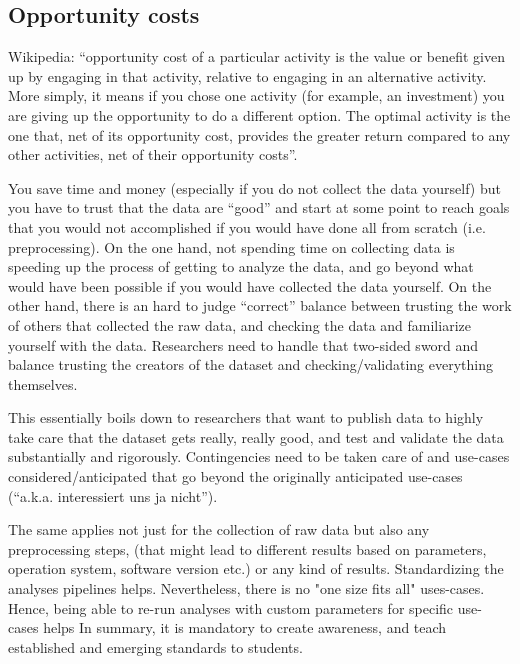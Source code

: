 \subsection{Opportunity costs}

Wikipedia: ``opportunity cost of a particular activity is the value or benefit
given up by engaging in that activity, relative to engaging in an alternative
activity.
%
More simply, it means if you chose one activity (for example, an investment) you
are giving up the opportunity to do a different option.
%
The optimal activity is the one that, net of its opportunity cost, provides the
greater return compared to any other activities, net of their opportunity
costs''.

%
You save time and money (especially if you do not collect the data yourself) but
you have to trust that the data are ``good'' and start at some point to reach
goals that you would not accomplished if you would have done all from scratch
(i.e. preprocessing).
%
On the one hand, not spending time on collecting data is speeding up the process
of getting to analyze the data, and go beyond what would have been possible if
you would have collected the data yourself.
%
On the other hand, there is an hard to judge ``correct'' balance between
trusting the work of others that collected the raw data, and checking the data
and familiarize yourself with the data.
%
Researchers need to handle that two-sided sword and balance trusting the
creators of the dataset and checking/validating everything themselves.

%
This essentially boils down to researchers that want to publish data to highly
take care that the dataset gets really, really good, and test and validate the
data substantially and rigorously.
%
Contingencies need to be taken care of and use-cases considered/anticipated that
go beyond the originally anticipated use-cases (``a.k.a. interessiert uns ja
nicht'').

%
The same applies not just for the collection of raw data but also any
preprocessing steps, (that might lead to different results based on parameters,
operation system, software version etc.) or any kind of results.
%
Standardizing the analyses pipelines helps.
%
Nevertheless, there is no "one size fits all" uses-cases.
%
Hence, being able to re-run analyses with custom parameters for specific
use-cases helps
%
In summary, it is mandatory to create awareness, and teach established and
emerging standards to students.



